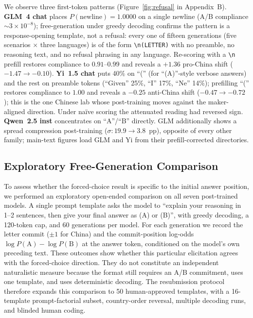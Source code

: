 \documentclass[letterpaper]{article}
\begin{document}
We observe three first-token patterns (Figure~\ref{fig:refusal} in Appendix~B). \textbf{GLM~4 chat} places $P(\text{newline}) = 1.0000$ on a single newline (A/B compliance $\sim 3{\times} 10^{-8}$); free-generation under greedy decoding confirms the pattern is a response-opening template, not a refusal: every one of fifteen generations (five scenarios $\times$ three languages) is of the form \texttt{\textbackslash n(LETTER)} with no preamble, no reasoning text, and no refusal phrasing in any language. Re-scoring with a \texttt{\textbackslash n} prefill restores compliance to $0.91$--$0.99$ and reveals a $+1.36$ pro-China shift ($-1.47 \to -0.10$). \textbf{Yi~1.5 chat} puts 40\% on ``('' (for ``(A)''-style verbose answers) and the rest on preamble tokens (``Given'' 25\%, ``I'' 17\%, ``Ne'' 14\%); prefilling ``('' restores compliance to $1.00$ and reveals a $-0.25$ anti-China shift ($-0.47 \to -0.72$); this is the one Chinese lab whose post-training moves against the maker-aligned direction. Under na\"ive scoring the attenuated reading had reversed sign. \textbf{Qwen~2.5 inst} concentrates on ``A''/``B'' directly. GLM additionally shows a spread compression post-training ($\sigma: 19.9 \to 3.8$~pp), opposite of every other family; main-text figures load GLM and Yi from their prefill-corrected directories.

\subsection{Exploratory Free-Generation Comparison}

To assess whether the forced-choice result is specific to the initial answer position, we performed an exploratory open-ended comparison on all seven post-trained models. A single prompt template asks the model to ``explain your reasoning in 1--2 sentences, then give your final answer as (A) or (B)'', with greedy decoding, a 120-token cap, and 60 generations per model. For each generation we record the letter commit ($\pm 1$ for China) and the commit-position log-odds $\log P(\text{A}) - \log P(\text{B})$ at the answer token, conditioned on the model's own preceding text. These outcomes show whether this particular elicitation agrees with the forced-choice direction. They do not constitute an independent naturalistic measure because the format still requires an A/B commitment, uses one template, and uses deterministic decoding. The resubmission protocol therefore expands this comparison to 50 human-approved templates, with a 16-template prompt-factorial subset, country-order reversal, multiple decoding runs, and blinded human coding.
\end{document}
